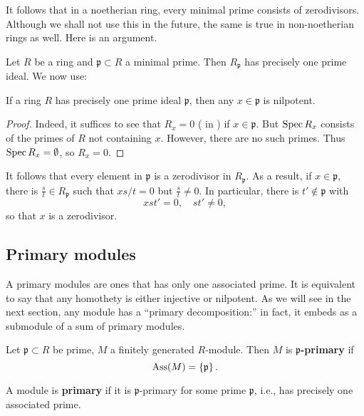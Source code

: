 \begin{remark} 
It follows that in a noetherian ring, every minimal prime consists of
zerodivisors. Although we shall not use this in the future, the same is true
in non-noetherian rings as well.  Here is an argument.

Let $R$ be a ring and $\mathfrak{p} \subset R$ a minimal prime. Then
$R_{\mathfrak{p}}$ has precisely one prime ideal.
We now use:

\begin{lemma} 
If a ring $R$ has precisely one prime ideal $\mathfrak{p}$, then any $x \in
\mathfrak{p}$ is nilpotent.
\end{lemma} 
\begin{proof} 
Indeed, it suffices to see that $R_x = 0$ ( in
) if $x \in
\mathfrak{p}$. But $\operatorname{Spec} R_x$
consists of the primes of $R$ not containing $x$. However, there are no such
primes. Thus $\operatorname{Spec} R_x = \emptyset$, so $R_x = 0$.
\end{proof} 

It follows that every element in $\mathfrak{p}$ is a zerodivisor in
$R_{\mathfrak{p}}$.
As a result, if $x \in \mathfrak{p}$, there is $\frac{s}{t} \in
R_{\mathfrak{p}}$ such that $xs/t = 0$ but $\frac{s}{t} \neq 0$.
In particular, there is $t' \notin \mathfrak{p}$ with 
\[ xst' = 0, \quad st' \neq 0,  \]
so that $x$ is a zerodivisor. 
\end{remark}



\subsection{Primary modules}

A primary modules are ones that has only one associated prime. It is equivalent
to say that any homothety is either injective or nilpotent. 
As we will see in the next section, any module has a ``primary
decomposition:'' in fact, it embeds as a submodule of a sum of primary
modules.

\begin{definition} 
Let $\mathfrak{p} \subset R$ be prime, $M$ a finitely generated  $R$-module. Then $M$ is
\textbf{$\mathfrak{p}$-primary} if 
\[ \operatorname{Ass}(M) = \left\{\mathfrak{p}\right\}.  \]

A module is \textbf{primary} if it is $\mathfrak{p}$-primary for some
prime $\mathfrak{p}$, i.e., has precisely one associated prime. 
\end{definition} 

